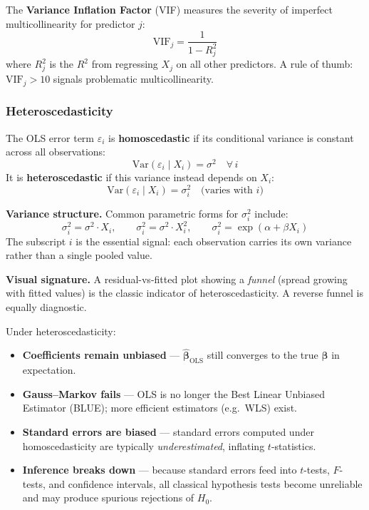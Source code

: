 \begin{remark}
The \textbf{Variance Inflation Factor} (VIF) measures the severity of imperfect multicollinearity for predictor $j$:
\[
\mathrm{VIF}_j = \frac{1}{1 - R_j^2}
\]
where $R_j^2$ is the $R^2$ from regressing $X_j$ on all other predictors. A rule of thumb: $\mathrm{VIF}_j > 10$ signals problematic multicollinearity.
\end{remark}

\subsubsection*{Heteroscedasticity}

\begin{definition}
The OLS error term $\varepsilon_i$ is \textbf{homoscedastic} if its conditional variance is constant across all observations:
\[
\mathrm{Var}(\varepsilon_i \mid X_i) = \sigma^2 \quad \forall\, i
\]
It is \textbf{heteroscedastic} if this variance instead depends on $X_i$:
\[
\mathrm{Var}(\varepsilon_i \mid X_i) = \sigma_i^2 \quad \text{(varies with } i\text{)}
\]
\end{definition}

\textbf{Variance structure.} Common parametric forms for $\sigma_i^2$ include:
\[
\sigma_i^2 = \sigma^2 \cdot X_i, \qquad \sigma_i^2 = \sigma^2 \cdot X_i^2, \qquad \sigma_i^2 = \exp(\alpha + \beta X_i)
\]
The subscript $i$ is the essential signal: each observation carries its own variance rather than a single pooled value.

\textbf{Visual signature.} A residual-vs-fitted plot showing a \emph{funnel} (spread growing with fitted values) is the classic indicator of heteroscedasticity. A reverse funnel is equally diagnostic.

\begin{remark}
Under heteroscedasticity:
\begin{itemize}
    \item \textbf{Coefficients remain unbiased} — $\hat{\boldsymbol{\beta}}_{\mathrm{OLS}}$ still converges to the true $\boldsymbol{\beta}$ in expectation.
    \item \textbf{Gauss--Markov fails} — OLS is no longer the Best Linear Unbiased Estimator (BLUE); more efficient estimators (e.g.\ WLS) exist.
    \item \textbf{Standard errors are biased} — standard errors computed under homoscedasticity are typically \emph{underestimated}, inflating $t$-statistics.
    \item \textbf{Inference breaks down} — because standard errors feed into $t$-tests, $F$-tests, and confidence intervals, all classical hypothesis tests become unreliable and may produce spurious rejections of $H_0$.
\end{itemize}
\end{remark}

